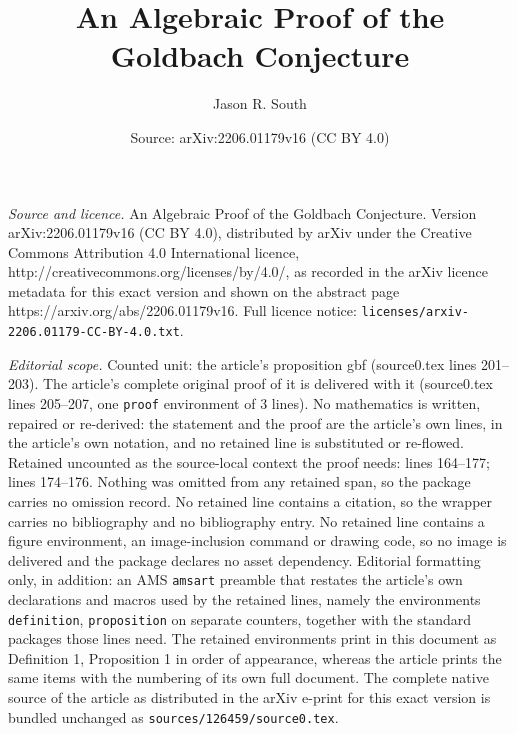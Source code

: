 \documentclass[10pt,a4paper]{amsart}
\title{An Algebraic Proof of the Goldbach Conjecture}
\author{Jason R. South}
\date{Source: arXiv:2206.01179v16 (CC BY 4.0)}
\begin{document}
\maketitle

\noindent\emph{Source and licence.} An Algebraic Proof of the Goldbach Conjecture. Version arXiv:2206.01179v16 (CC BY 4.0), distributed by arXiv under the Creative Commons Attribution 4.0 International licence, http://creativecommons.org/licenses/by/4.0/, as recorded in the arXiv licence metadata for this exact version and shown on the abstract page https://arxiv.org/abs/2206.01179v16. Full licence notice: \texttt{licenses/arxiv-2206.01179-CC-BY-4.0.txt}.\par\smallskip

\noindent\textit{Editorial scope.} Counted unit: the article's proposition gbf (source0.tex lines 201--203). The article's complete original proof of it is delivered with it (source0.tex lines 205--207, one \texttt{proof} environment of 3 lines). No mathematics is written, repaired or re-derived: the statement and the proof are the article's own lines, in the article's own notation, and no retained line is substituted or re-flowed.  Retained uncounted as the source-local context the proof needs: lines 164--177; lines 174--176.  Nothing was omitted from any retained span, so the package carries no omission record.  No retained line contains a citation, so the wrapper carries no bibliography and no bibliography entry.  No retained line contains a figure environment, an image-inclusion command or drawing code, so no image is delivered and the package declares no asset dependency.  Editorial formatting only, in addition: an AMS \texttt{amsart} preamble that restates the article's own declarations and macros used by the retained lines, namely the environments \texttt{definition}, \texttt{proposition} on separate counters, together with the standard packages those lines need.  The retained environments print in this document as Definition 1, Proposition 1 in order of appearance, whereas the article prints the same items with the numbering of its own full document.  The complete native source of the article as distributed in the arXiv e-print for this exact version is bundled unchanged as \texttt{sources/126459/source0.tex}.
\end{document}
